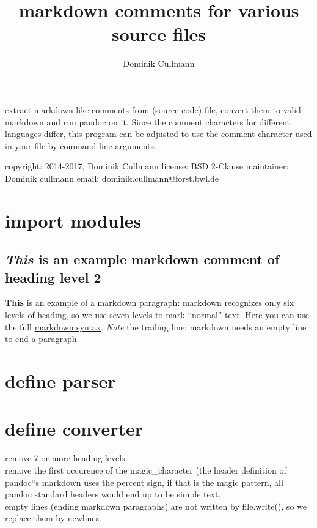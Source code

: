 \documentclass[]{article}
\title{markdown comments for various source files}
\author{Dominik Cullmann}
\begin{document}
\maketitle

extract markdown-like comments from (source code) file, convert them to
valid markdown and run pandoc on it. Since the comment characters for
different languages differ, this program can be adjusted to use the
comment character used in your file by command line arguments.

copyright: 2014-2017, Dominik Cullmann license: BSD 2-Clause maintainer:
Dominik cullmann email: dominik.cullmann@forst.bwl.de

\section{import modules}\label{import-modules}

\subsection{\emph{This} is an example markdown comment of heading level
2}\label{this-is-an-example-markdown-comment-of-heading-level-2}

\textbf{This} is an example of a markdown paragraph: markdown recognizes
only six levels of heading, so we use seven levels to mark ``normal''
text. Here you can use the full
\href{http://daringfireball.net/projects/markdown/syntax}{markdown
syntax}. \emph{Note} the trailing line: markdown needs an empty line to
end a paragraph.

\section{define parser}\label{define-parser}

\section{define converter}\label{define-converter}

remove 7 or more heading levels.\\remove the first occurence of the
magic\_character (the header definition of pandoc``s markdown uses the
percent sign, if that is the magic pattern, all pandoc standard headers
would end up to be simple text.\\empty lines (ending markdown
paragraphs) are not written by file.write(), so we replace them by
newlines.
\end{document}

